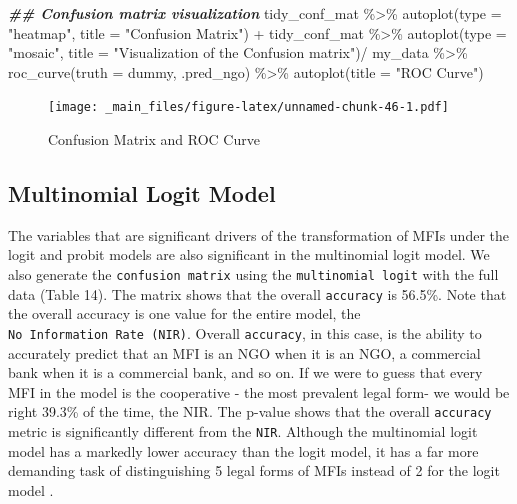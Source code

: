 \documentclass[a4paper,nobind]{templates/ociamthesis}
\newenvironment{Shaded}{\begin{snugshade}}{\end{snugshade}}
\newcommand{\AttributeTok}[1]{\textcolor[rgb]{0.77,0.63,0.00}{#1}}
\newcommand{\DocumentationTok}[1]{\textcolor[rgb]{0.56,0.35,0.01}{\textbf{\textit{#1}}}}
\newcommand{\FunctionTok}[1]{\textcolor[rgb]{0.00,0.00,0.00}{#1}}
\newcommand{\NormalTok}[1]{#1}
\newcommand{\SpecialCharTok}[1]{\textcolor[rgb]{0.00,0.00,0.00}{#1}}
\newcommand{\StringTok}[1]{\textcolor[rgb]{0.31,0.60,0.02}{#1}}
\renewenvironment{Shaded}
{
  \vspace{10pt}%
  \begin{snugshade}%
}{%
  \end{snugshade}%
  \vspace{8pt}%
}
\begin{document}
\begin{landscape}
\begin{Shaded}
\begin{Highlighting}[]
\DocumentationTok{\#\# Confusion matrix visualization }
\NormalTok{tidy\_conf\_mat }\SpecialCharTok{\%\textgreater{}\%} \FunctionTok{autoplot}\NormalTok{(}\AttributeTok{type =} \StringTok{"heatmap"}\NormalTok{, }\AttributeTok{title =} \StringTok{"Confusion Matrix"}\NormalTok{) }\SpecialCharTok{+}
\NormalTok{tidy\_conf\_mat }\SpecialCharTok{\%\textgreater{}\%} \FunctionTok{autoplot}\NormalTok{(}\AttributeTok{type =} \StringTok{"mosaic"}\NormalTok{, }\AttributeTok{title =} \StringTok{"Visualization of the Confusion matrix"}\NormalTok{)}\SpecialCharTok{/}
\NormalTok{my\_data }\SpecialCharTok{\%\textgreater{}\%} \FunctionTok{roc\_curve}\NormalTok{(}\AttributeTok{truth =}\NormalTok{ dummy, .pred\_ngo) }\SpecialCharTok{\%\textgreater{}\%} \FunctionTok{autoplot}\NormalTok{(}\AttributeTok{title =} \StringTok{"ROC Curve"}\NormalTok{)}
\end{Highlighting}
\end{Shaded}

\begin{figure}
\centering
\texttt{[image: \_main\_files/figure-latex/unnamed-chunk-46-1.pdf]}
\caption{\label{fig:unnamed-chunk-46}Confusion Matrix and ROC Curve}
\end{figure}

\newpage
\end{landscape}

\newpage

\hypertarget{multinomial-logit-model-1}{%
\subsection{Multinomial Logit Model}\label{multinomial-logit-model-1}}

The variables that are significant drivers of the transformation of MFIs under the logit and probit models are also significant in the multinomial logit model. We also generate the \texttt{confusion\ matrix} using the \texttt{multinomial\ logit} with the full data (Table 14). The matrix shows that the overall \texttt{accuracy} is 56.5\%. Note that the overall accuracy is one value for the entire model, the \texttt{No\ Information\ Rate\ (NIR)}. Overall \texttt{accuracy}, in this case, is the ability to accurately predict that an MFI is an NGO when it is an NGO, a commercial bank when it is a commercial bank, and so on. If we were to guess that every MFI in the model is the cooperative - the most prevalent legal form- we would be right 39.3\% of the time, the NIR. The p-value shows that the overall \texttt{accuracy} metric is significantly different from the \texttt{NIR}. Although the multinomial logit model has a markedly lower accuracy than the logit model, it has a far more demanding task of distinguishing 5 legal forms of MFIs instead of 2 for the logit model \autocite{kwak2002multinomial}.
\end{document}
